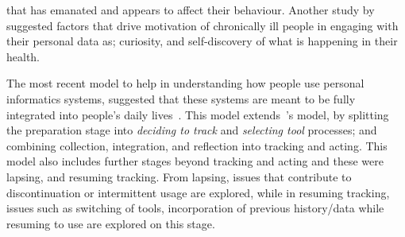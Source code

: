that has emanated and appears to affect their behaviour. Another study by~\cite{macleod2013personal} suggested factors that drive motivation of chronically ill people in engaging with their personal data as; curiosity, and self-discovery of what is happening in their health.

The most recent model to help in understanding how people use personal informatics systems, suggested that these systems are meant to be fully integrated into people's daily lives~\citep{epstein2015lived}. This model extends~\cite{li2010stage}'s model, by splitting the preparation stage into \emph{deciding to track} and \emph{selecting tool} processes; and combining collection, integration, and reflection into tracking and acting. This model also includes further stages beyond tracking and acting and these were lapsing, and resuming tracking.  From lapsing, issues that contribute to discontinuation or intermittent usage are explored, while in resuming tracking, issues such as switching of tools, incorporation of previous history/data while resuming to use are explored on this stage.  

